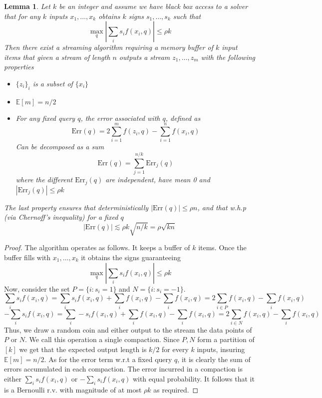 \documentclass{article} %
\newtheorem{lemma}[theorem]{Lemma}
\newcommand{\E}{\mathbb{E}}
\begin{document}
\begin{lemma} \label{lem:compactor}
Let $k$ be an integer and assume we have black box access to a solver that for any $k$ inputs $x_1,\ldots,x_k$ obtains $k$ signs $s_1,\ldots,s_k$ such that
$$\max_q \left| \sum_i s_i f(x_i, q)\right| \leq \rho k$$
Then there exist a streaming algorithm requiring a memory buffer of $k$ input items that given a stream of length $n$ outputs a stream $z_1,\ldots,z_m$ with the following properties
\begin{itemize}
\item $\{z_i\}_i$ is a subset of $\{x_i\}$
\item $\E[m] = n/2$
\item For any fixed query $q$, the error associated with $q$, defined as
$$\text{Err}(q) = 2\sum_{i=1}^m f(z_i,q) - \sum_{i=1}^n f(x_i,q)  $$
Can be decomposed as a sum
$$\text{Err}(q) = \sum_{j=1}^{n/k} \text{Err}_j(q)$$
where the different $\text{Err}_j(q)$ are independent, have mean 0 and $|\text{Err}_j(q)| \leq \rho k$
\end{itemize}
The last property ensures that deterministically $|\text{Err}(q)| \leq \rho n$, and that w.h.p (via Chernoff's inequality) for a fixed $q$ 
$$|\text{Err}(q)| \lesssim \rho k\sqrt{n/k} = \rho \sqrt{kn}$$
\end{lemma}
\begin{proof}
The algorithm operates as follows. It keeps a buffer of $k$ items. Once the buffer fills with $x_1,\ldots,x_k$ it obtains the signs guaranteeing
$$\max_q \left| \sum_i s_i f(x_i, q)\right| \leq \rho k$$
Now, consider the set $P=\{i:s_i=1\}$ and $N=\{i:s_i=-1\}$.
$$ \sum_i s_i f(x_i, q) = \sum_i s_i f(x_i, q) + \sum_i f(x_i,q) - \sum_i f(x_i,q) = 2\sum_{i \in P} f(x_i,q) - \sum_i f(x_i, q)   $$
$$ -\sum_i s_i f(x_i, q) = \sum_i -s_i f(x_i, q) + \sum_i f(x_i,q) - \sum_i f(x_i,q) = 2\sum_{i \in N} f(x_i,q) - \sum_i f(x_i, q)   $$
Thus, we draw a random coin and either output to the stream the data points of $P$ or $N$. We call this operation a single compaction. Since $P,N$ form a partition of $[k]$ we get that the expected output length is $k/2$ for every $k$ inputs, insuring $\E[m]=n/2$. As for the error term w.r.t a fixed query $q$, it is clearly the sum of errors accumulated in each compaction. The error incurred in a compaction is either 
$\sum_i s_i f(x_i, q)$ or $-\sum_i s_i f(x_i, q)$ with equal probability. It follows that it is a Bernoulli r.v. with magnitude of at most $\rho k$ as required.
\end{proof}
\end{document}
